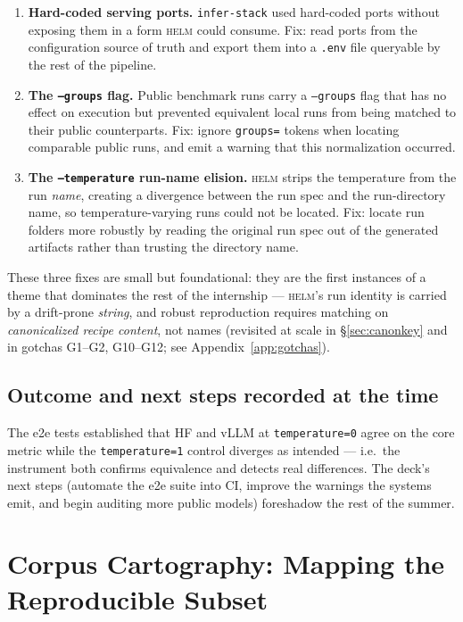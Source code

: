 \documentclass[11pt]{report}
\newcommand{\code}[1]{\texttt{#1}}
\begin{document}
\begin{enumerate}
  \item \textbf{Hard-coded serving ports.} \code{infer-stack} used hard-coded
        ports without exposing them in a form \textsc{helm} could consume. Fix:
        read ports from the configuration source of truth and export them into a
        \code{.env} file queryable by the rest of the pipeline.
  \item \textbf{The \code{--groups} flag.} Public benchmark runs carry a
        \code{--groups} flag that has no effect on execution but prevented
        equivalent local runs from being matched to their public counterparts. Fix:
        ignore \code{groups=} tokens when locating comparable public runs, and emit
        a warning that this normalization occurred.
  \item \textbf{The \code{--temperature} run-name elision.} \textsc{helm} strips
        the temperature from the run \emph{name}, creating a divergence between the
        run spec and the run-directory name, so temperature-varying runs could not
        be located. Fix: locate run folders more robustly by reading the original
        run spec out of the generated artifacts rather than trusting the directory
        name.
\end{enumerate}

These three fixes are small but foundational: they are the first instances of a
theme that dominates the rest of the internship --- \textsc{helm}'s run identity is
carried by a drift-prone \emph{string}, and robust reproduction requires matching
on \emph{canonicalized recipe content}, not names (revisited at scale in
\S\ref{sec:canonkey} and in gotchas G1--G2, G10--G12; see
Appendix~\ref{app:gotchas}).

\section{Outcome and next steps recorded at the time}

The e2e tests established that HF and vLLM at \code{temperature=0} agree on the
core metric while the \code{temperature=1} control diverges as intended --- i.e.\
the instrument both confirms equivalence and detects real differences. The deck's
next steps (automate the e2e suite into CI, improve the warnings the systems emit,
and begin auditing more public models) foreshadow the rest of the summer.

\chapter{Corpus Cartography: Mapping the Reproducible Subset}
\label{chap:cartography}
\end{document}
